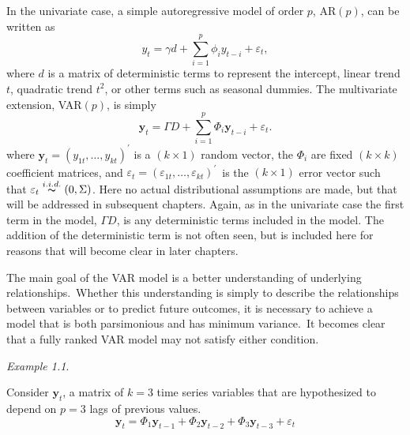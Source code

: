 In the univariate case, a simple autoregressive model of order $p$,
AR$(p)$, can be written as
\[
y_{t}=\gamma d+\sum_{i=1}^{p}\phi_{i}y_{t-i}+\varepsilon_{t},
\]
where $d$ is a matrix of deterministic terms to represent the intercept,
linear trend $t$, quadratic trend $t^{2}$, or other terms such as
seasonal dummies. The multivariate extension, VAR$(p)$, is simply
\begin{equation}
\mathbf{y}_{t}=\Gamma D+\sum_{i=1}^{p}\Phi_{i}\mathbf{y}_{t-i}+\varepsilon_{t}.
\end{equation}
where $\mathbf{y}_{t}=\left(y_{1t},\ldots,y_{kt}\right)^{\prime}$
is a $\left(k\times1\right)$ random vector, the $\Phi_{i}$ are fixed
$\left(k\times k\right)$ coefficient matrices, and $\varepsilon_{t}=\left(\varepsilon_{1t},\ldots,\varepsilon_{kt}\right)^{\prime}$\ is
the $\left(k\times1\right)$ error vector such that $\varepsilon_{t}\overset{i.i.d.}{\thicksim}\left(0,\Sigma\right)$.
Here no actual distributional assumptions are made, but that will
be addressed in subsequent chapters. Again, as in the univariate case
the first term in the model, $\Gamma D$, is any deterministic terms
included in the model. The addition of the deterministic term is not
often seen, but is included here for reasons that will become clear
in later chapters.

The main goal of the VAR model is a better understanding of underlying
relationships.\ Whether this understanding is simply to describe
the relationships between variables or to predict future outcomes,
it is necessary to achieve a model that is both parsimonious and has
minimum variance.\ It becomes clear that a fully ranked VAR model
may not satisfy either condition.

\emph{Example 1.1}.

Consider $\mathbf{y}_{t}$, a matrix of $k=3$ time series variables
that are hypothesized to depend on $p=3$ lags of previous values.
\begin{equation}
\mathbf{y}_{t}=\Phi_{1}\mathbf{y}_{t-1}+\Phi_{2}\mathbf{y}_{t-2}+\Phi_{3}\mathbf{y}_{t-3}+\varepsilon_{t}\label{3 var, 3 lag example}
\end{equation}


